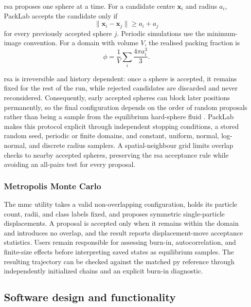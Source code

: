 \documentclass[preprint,12pt]{elsarticle}
\begin{document}
\gls{rsa} proposes one sphere at a time. %
For a candidate centre $\mathbf{x}_i$ and radius $a_i$, PackLab accepts the candidate only if
\begin{equation}
	\lVert \mathbf{x}_i - \mathbf{x}_j \rVert \geq a_i + a_j
\end{equation}
for every previously accepted sphere $j$. %
Periodic simulations use the minimum-image convention. %
For a domain with volume $V$, the realised packing fraction is
\begin{equation}
	\phi = \frac{1}{V}\sum_i \frac{4\pi a_i^3}{3}. %
\end{equation}

\gls{rsa} is irreversible and history dependent: once a sphere is accepted, it remains fixed for the rest of the run, while rejected candidates are discarded and never reconsidered. %
Consequently, early accepted spheres can block later positions permanently, so the final configuration depends on the order of random proposals rather than being a sample from the equilibrium hard-sphere fluid \cite{Feder1980}. %
PackLab makes this protocol explicit through independent stopping conditions, a stored random seed, periodic or finite domains, and constant, uniform, normal, log-normal, and discrete radius samplers. %
A spatial-neighbour grid limits overlap checks to nearby accepted spheres, preserving the \gls{rsa} acceptance rule while avoiding an all-pairs test for every proposal. %

\subsubsection{Metropolis Monte Carlo}

The \gls{mmc} utility takes a valid non-overlapping configuration, holds its particle count, radii, and class labels fixed, and proposes symmetric single-particle displacements. %
A proposal is accepted only when it remains within the domain and introduces no overlap, and the result reports displacement-move acceptance statistics. %
Users remain responsible for assessing burn-in, autocorrelation, and finite-size effects before interpreting saved states as equilibrium samples. %
The resulting trajectory can be checked against the matched \gls{py} reference through independently initialized chains and an explicit burn-in diagnostic. %

\subsection{Software design and functionality}
\end{document}
